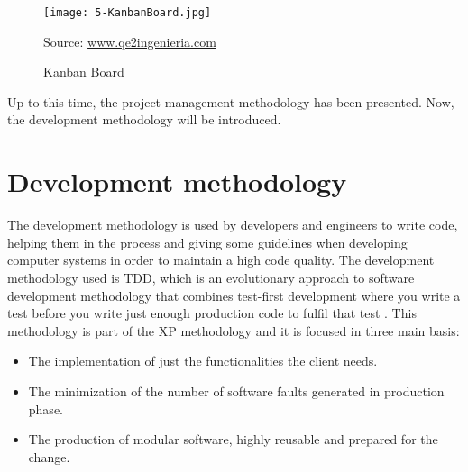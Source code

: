 \begin{figure}[!h]
	\begin{center}
		\texttt{[image: 5-KanbanBoard.jpg]}
		\caption{Kanban Board}
		\label{fig:5-KanbanBoard}{Source: \url{www.qe2ingenieria.com}}
	\end{center}
\end{figure}

Up to this time, the project management methodology has been presented. Now, the development methodology will be introduced.


\section{Development methodology}
The development methodology is used by developers and engineers to write code, helping them in the process and giving some guidelines when developing computer systems in order to maintain a high code quality. The development methodology used is \acf{TDD}, which is an evolutionary approach to software development methodology that combines test-first development where you write a test before you write just enough production code to fulfil that test \cite{IntroTDD,Ble10}. This methodology is part of the \ac{XP} methodology and it is focused in three main basis:
\begin{itemize}
	\item The implementation of just the functionalities the client needs.
	\item The minimization of the number of software faults generated in production phase.
	\item The production of modular software, highly reusable and prepared for the change.
\end{itemize}

